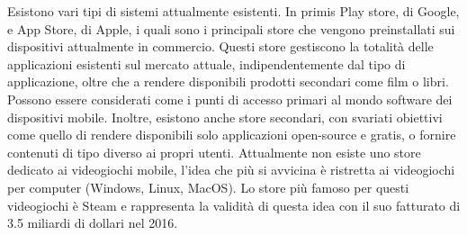 Esistono vari tipi di sistemi attualmente esistenti. In primis Play store, di Google, e App Store, di Apple, i quali sono i principali store che vengono preinstallati sui dispositivi attualmente in commercio. Questi store gestiscono la totalità delle applicazioni esistenti sul mercato attuale, indipendentemente dal tipo di applicazione, oltre che a rendere disponibili prodotti secondari come film o libri. Possono essere considerati come i punti di accesso primari al mondo software dei dispositivi mobile. Inoltre, esistono anche store secondari, con svariati obiettivi come quello di rendere disponibili solo applicazioni open-source e gratis, o fornire contenuti di tipo diverso ai propri utenti. Attualmente non esiste uno store dedicato ai videogiochi mobile, l’idea che più si avvicina è ristretta ai videogiochi per computer (Windows, Linux, MacOS). Lo store più famoso per questi videogiochi è Steam e rappresenta la validità di questa idea con il suo fatturato di 3.5 miliardi di dollari nel 2016.